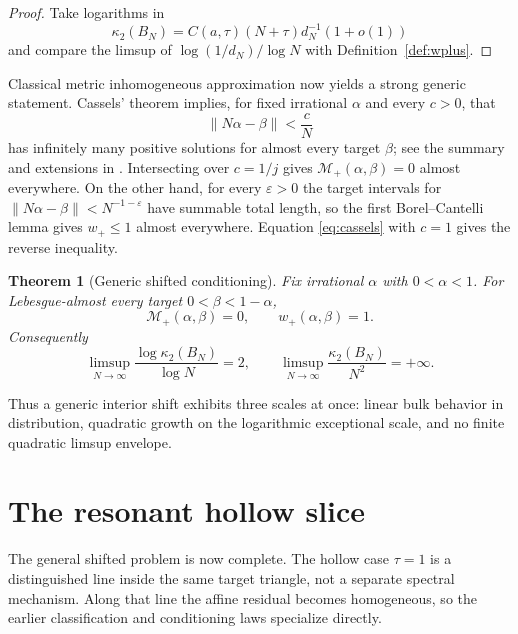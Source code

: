 \documentclass[11pt,reqno]{amsart}
\theoremstyle{plain}
\newtheorem{theorem}{Theorem}
\theoremstyle{definition}
\newcommand{\BN}{B_N}
\newcommand{\norm}[1]{\left\lVert #1\right\rVert}
\begin{document}
\begin{proof}
Take logarithms in
\[
\kappa_2(\BN)=C(a,\tau)(N+\tau)d_N^{-1}(1+o(1))
\]
and compare the limsup of $\log(1/d_N)/\log N$ with
Definition~\ref{def:wplus}.
\end{proof}

Classical metric inhomogeneous approximation now yields a strong generic statement.
Cassels' theorem implies, for fixed irrational $\alpha$ and every $c>0$, that
\begin{equation}\label{eq:cassels}
\norm{N\alpha-\beta}<\frac{c}{N}
\end{equation}
has infinitely many positive solutions for almost every target $\beta$; see the
summary and extensions in \cite{LiaoRams,Cassels}.  Intersecting over $c=1/j$ gives
$\mathcal M_+(\alpha,\beta)=0$ almost everywhere.  On the other hand, for every
$\varepsilon>0$ the target intervals for
$\norm{N\alpha-\beta}<N^{-1-\varepsilon}$ have summable total length, so the first
Borel--Cantelli lemma gives $w_+\le1$ almost everywhere.  Equation
\eqref{eq:cassels} with $c=1$ gives the reverse inequality.

\begin{theorem}[Generic shifted conditioning]\label{thm:generic}
Fix irrational $\alpha$ with $0<\alpha<1$.  For Lebesgue-almost every target
$0<\beta<1-\alpha$,
\begin{equation}\label{eq:genericM}
\mathcal M_+(\alpha,\beta)=0,
\qquad
w_+(\alpha,\beta)=1.
\end{equation}
Consequently
\begin{equation}\label{eq:genericcond}
\boxed{
\limsup_{N\to\infty}\frac{\log\kappa_2(\BN)}{\log N}=2,
\qquad
\limsup_{N\to\infty}\frac{\kappa_2(\BN)}{N^2}=+\infty.}
\end{equation}
\end{theorem}

Thus a generic interior shift exhibits three scales at once: linear bulk behavior in
distribution, quadratic growth on the logarithmic exceptional scale, and no finite
quadratic limsup envelope.

\section{The resonant hollow slice}\label{sec:resonance}

The general shifted problem is now complete.  The hollow case $\tau=1$ is a
distinguished line inside the same target triangle, not a separate spectral
mechanism.  Along that line the affine residual becomes homogeneous, so the earlier
classification and conditioning laws specialize directly.
\end{document}
